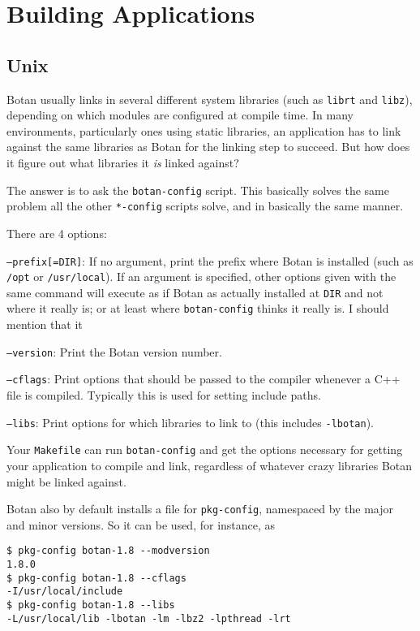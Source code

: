 \documentclass{article}
\newcommand{\filename}[1]{\texttt{#1}}
\begin{document}
\section{Building Applications}

\subsection{Unix}

Botan usually links in several different system libraries (such as
\texttt{librt} and \texttt{libz}), depending on which modules are
configured at compile time. In many environments, particularly ones
using static libraries, an application has to link against the same
libraries as Botan for the linking step to succeed. But how does it
figure out what libraries it \emph{is} linked against?

The answer is to ask the \filename{botan-config} script. This
basically solves the same problem all the other \filename{*-config}
scripts solve, and in basically the same manner.

There are 4 options:

\texttt{--prefix[=DIR]}: If no argument, print the prefix where Botan
is installed (such as \filename{/opt} or \filename{/usr/local}). If an
argument is specified, other options given with the same command will
execute as if Botan as actually installed at \filename{DIR} and not
where it really is; or at least where \filename{botan-config} thinks
it really is. I should mention that it

\texttt{--version}: Print the Botan version number.

\texttt{--cflags}: Print options that should be passed to the compiler
whenever a C++ file is compiled. Typically this is used for setting
include paths.

\texttt{--libs}: Print options for which libraries to link to (this includes
\texttt{-lbotan}).

Your \filename{Makefile} can run \filename{botan-config} and get the
options necessary for getting your application to compile and link,
regardless of whatever crazy libraries Botan might be linked against.

Botan also by default installs a file for \texttt{pkg-config},
namespaced by the major and minor versions. So it can be used,
for instance, as

\begin{verbatim}
$ pkg-config botan-1.8 --modversion
1.8.0
$ pkg-config botan-1.8 --cflags
-I/usr/local/include
$ pkg-config botan-1.8 --libs
-L/usr/local/lib -lbotan -lm -lbz2 -lpthread -lrt
\end{verbatim}
\end{document}
